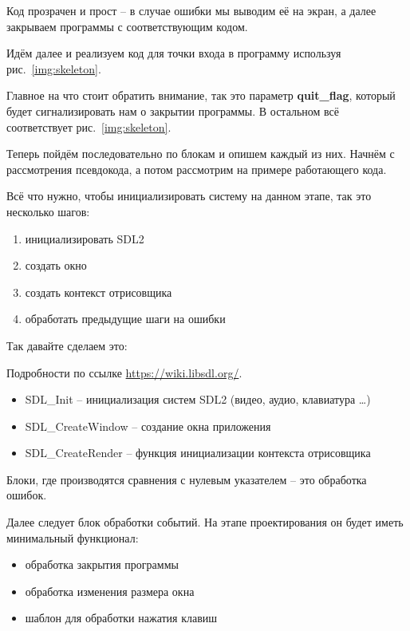 Код прозрачен и прост -- в случае ошибки мы выводим её на экран, а далее закрываем программы с 
соответствующим кодом. 

Идём далее и реализуем код для точки входа в программу используя рис.~\ref{img:skeleton}.


Главное на что стоит обратить внимание, так это параметр \textbf{quit\_flag}, который будет сигнализировать 
нам о закрытии программы. В остальном всё соответствует рис.~\ref{img:skeleton}.

Теперь пойдём последовательно по блокам и опишем каждый из них. Начнём с рассмотрения псевдокода, а потом 
рассмотрим на примере работающего кода.

Всё что нужно, чтобы инициализировать систему на данном этапе, так это несколько шагов:
\begin{enumerate}\itemsep-5pt
    \item инициализировать SDL2
    \item создать окно
    \item создать контекст отрисовщика
    \item обработать предыдущие шаги на ошибки
\end{enumerate}

\newpage

Так давайте сделаем это:


Подробности по ссылке \url{https://wiki.libsdl.org/}.

\begin{itemize}\itemsep-5pt
    \item SDL\_Init -- инициализация систем SDL2 (видео, аудио, клавиатура \ldots)
    \item SDL\_CreateWindow -- создание окна приложения
    \item SDL\_CreateRender -- функция инициализации контекста отрисовщика
\end{itemize}

Блоки, где производятся сравнения с нулевым указателем -- это обработка ошибок.

Далее следует блок обработки событий. На этапе проектирования он будет иметь минимальный функционал:
\begin{itemize}\itemsep-5pt
    \item обработка закрытия программы
    \item обработка изменения размера окна
    \item шаблон для обработки нажатия клавиш
\end{itemize}

